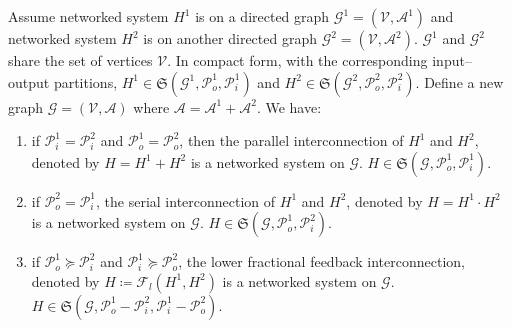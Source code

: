 \begin{lemma}\label{lm:nwsint}
Assume networked system \(H^1\) is on a directed graph \(\mathcal{G}^1 = (\mathcal{V}, \mathcal{A}^1)\) and networked system \(H^2\) is on another directed graph \(\mathcal{G}^2 = (\mathcal{V}, \mathcal{A}^2)\). \(\mathcal{G}^1\) and \(\mathcal{G}^2\) share the set of vertices \(\mathcal{V}\).
In compact form, with the corresponding input–output partitions, \(H^1 \in \mathfrak{S}(\mathcal{G}^1, \mathcal{P}_o^1, \mathcal{P}_i^1)\) and \(H^2 \in \mathfrak{S}(\mathcal{G}^2, \mathcal{P}_o^2, \mathcal{P}_i^2)\). Define a new graph \(\mathcal{G} = (\mathcal{V}, \mathcal{A})\) where \(\mathcal{A} = \mathcal{A}^1 + \mathcal{A}^2\). We have:
\begin{enumerate}
    \item if \(\mathcal{P}_i^1 = \mathcal{P}_i^2\) and \(\mathcal{P}_o^1 = \mathcal{P}_o^2\), then the parallel interconnection of \(H^1\) and \(H^2\), denoted by \(H = H^1 + H^2\) is a networked system on \(\mathcal{G}\). \(H\in \mathfrak{S}(\mathcal{G}, \mathcal{P}_o^1, \mathcal{P}_i^1)\).
    \item if \(\mathcal{P}_o^2 = \mathcal{P}_i^1\), the serial interconnection of \(H^1\) and \(H^2\), denoted by \(H = H^1 \cdot H^2\) is a networked system on \(\mathcal{G}\). \(H\in \mathfrak{S}(\mathcal{G}, \mathcal{P}_o^1, \mathcal{P}_i^2)\).
    \item if \(\mathcal{P}_o^1 \succeq \mathcal{P}_i^2\) and \(\mathcal{P}_i^1 \succeq \mathcal{P}_o^2\), the lower fractional feedback interconnection, denoted by \(H\coloneqq \mathcal{F}_l(H^1, H^2)\) is a networked system on \(\mathcal{G}\). \(H\in \mathfrak{S}(\mathcal{G}, \mathcal{P}_o^1 - \mathcal{P}_i^2, \mathcal{P}_i^1 -\mathcal{P}_o^2)\). 
\end{enumerate}

\end{lemma}

